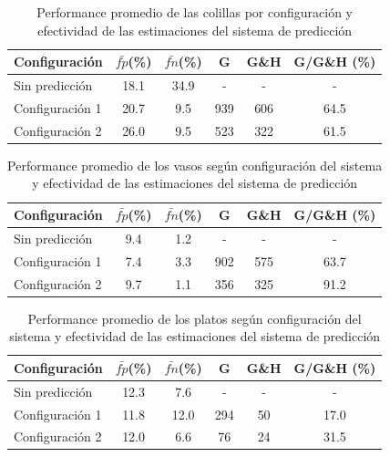 \begin{table}[htb]
  \begin{tabular}{|l | c | c | c | c | c|}
	\hline  
	\textbf{Configuración} & \textbf{$\bar{fp}$(\%)} &  \textbf{$\bar{fn}$(\%)}& \textbf{G} &  \textbf{G\&H} &  \textbf{G/G\&H (\%)} \\
	\hline
	\hline
	Sin predicción  & 18.1 & 34.9 & - & - & - \\
	\hline
	Configuración 1 & 20.7 & 9.5 & 939 & 606 & 64.5  \\
	\hline
	Configuración 2 & 26.0 & 9.5 & 523 & 322 & 61.5 \\
	\hline
	\end{tabular}
	\caption{\label{tab:evo_colillas} Performance promedio de las colillas 
	por configuración y  efectividad de las estimaciones del sistema de predicción}
\end{table}

\begin{table}[htb]
  \begin{tabular}{|l | c | c | c | c | c|}
	\hline
	\textbf{Configuración} & \textbf{$\bar{fp}$(\%)} &  \textbf{$\bar{fn}$(\%)}& \textbf{G} &  \textbf{G\&H} &  \textbf{G/G\&H (\%)} \\
	\hline
	\hline
	Sin predicción  & 9.4 & 1.2 & - & - & -\\
	\hline
	Configuración 1 & 7.4 &	3.3 & 902 & 575 & 63.7 \\
	\hline
	Configuración 2 & 9.7 &	1.1 & 356 & 325 & 91.2\\
	\hline
	\end{tabular}
	\caption{\label{tab:evo_vasos} Performance promedio de los vasos según configuración del 
	sistema y efectividad de las estimaciones del sistema de predicción}
\end{table}



\begin{table}[htb]
  \begin{tabular}{|l | c | c | c | c | c|}
	\hline
	\textbf{Configuración} & \textbf{$\bar{fp}$(\%)} &  \textbf{$\bar{fn}$(\%)}& \textbf{G} &  \textbf{G\&H} &  \textbf{G/G\&H (\%)} \\
	\hline
	\hline
	Sin predicción &  12.3 & 7.6 & - & - & -\\
	\hline
	Configuración 1 & 11.8 & 12.0 & 294 & 50 & 17.0\\
	\hline
	Configuración 2 & 12.0 & 6.6 & 76 & 24 & 31.5 \\
	\hline
	\end{tabular}
	\caption{\label{tab:evo_platos} Performance promedio de los platos según configuración del 
	sistema y efectividad de las estimaciones del sistema de predicción}
\end{table}


